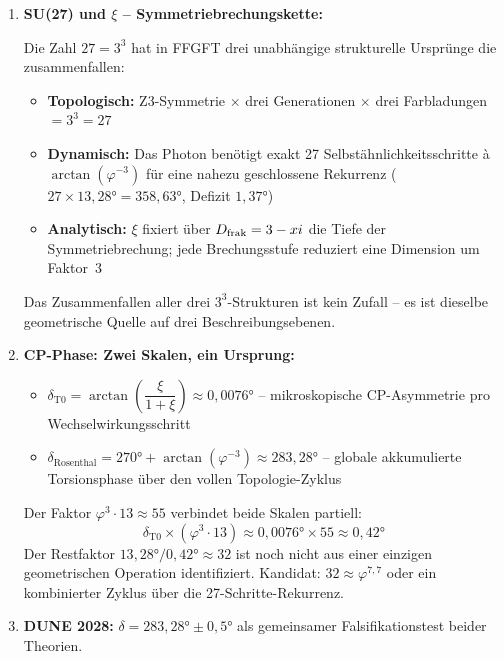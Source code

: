 \begin{enumerate}
  Die drei primitiven Windungsklassen entsprechen den drei Z3-Sektoren der Torus-Topologie -- Generationen sind keine zusätzliche Eingabe sondern topologische Konsequenz.

  \item \textbf{SU(27) und $\xi$ -- Symmetriebrechungskette:}

  Die Zahl $27 = 3^3$ hat in FFGFT drei unabhängige strukturelle Ursprünge die zusammenfallen:
  \begin{itemize}[noitemsep]
    \item \textbf{Topologisch:} Z3-Symmetrie $\times$ drei Generationen $\times$ drei Farbladungen $= 3^3 = 27$
    \item \textbf{Dynamisch:} Das Photon benötigt exakt 27 Selbstähnlichkeitsschritte à $\arctan(\varphi^{-3})$ für eine nahezu geschlossene Rekurrenz ($27 \times 13{,}28° = 358{,}63°$, Defizit $1{,}37°$)
    \item \textbf{Analytisch:} $\xi$ fixiert über $D_{\text{frak}} = 3 - xi$ die Tiefe der Symmetriebrechung; jede Brechungsstufe reduziert eine Dimension um Faktor~3
  \end{itemize}
  Das Zusammenfallen aller drei $3^3$-Strukturen ist kein Zufall -- es ist dieselbe geometrische Quelle auf drei Beschreibungsebenen.

  \item \textbf{CP-Phase: Zwei Skalen, ein Ursprung:}
  \begin{itemize}[noitemsep]
    \item $\delta_{\text{T0}} = \arctan\!\left(\dfrac{\xi}{1+\xi}\right) \approx 0{,}0076°$ -- mikroskopische CP-Asymmetrie pro Wechselwirkungsschritt
    \item $\delta_{\text{Rosenthal}} = 270° + \arctan(\varphi^{-3}) \approx 283{,}28°$ -- globale akkumulierte Torsionsphase über den vollen Topologie-Zyklus
  \end{itemize}

  Der Faktor $\varphi^3 \cdot 13 \approx 55$ verbindet beide Skalen partiell:
  \[
    \delta_{\text{T0}} \times (\varphi^3 \cdot 13) \approx 0{,}0076° \times 55 \approx 0{,}42°
  \]
  Der Restfaktor $13{,}28° / 0{,}42° \approx 32$ ist noch nicht aus einer einzigen geometrischen Operation identifiziert. Kandidat: $32 \approx \varphi^{7{,}7}$ oder ein kombinierter Zyklus über die 27-Schritte-Rekurrenz.

  \item \textbf{DUNE 2028:} $\delta = 283{,}28° \pm 0{,}5°$ als gemeinsamer Falsifikationstest beider Theorien.

\end{enumerate}


